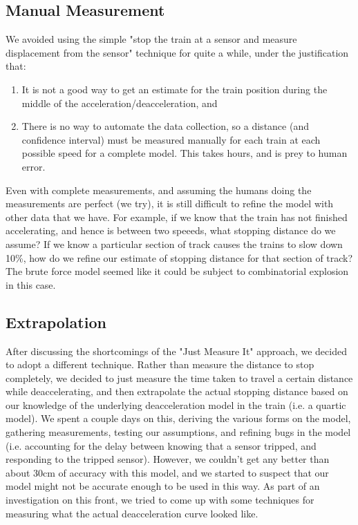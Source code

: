 \documentclass[titlepage]{article}
\begin{document}
\subsection{Manual Measurement}
We avoided using the simple "stop the train
at a sensor and measure displacement from the sensor" technique for quite a
while, under the justification that:
\begin{enumerate}
\item It is not a good way to get an estimate for the train position during
	the middle of the acceleration/deacceleration, and
\item There is no way to automate the data collection, so a distance (and
confidence interval) must be measured manually for each train at each possible
speed for a complete model. This takes hours, and is prey to human error.
\end{enumerate}
Even with complete measurements, and assuming the humans doing the measurements
are perfect (we try), it is still difficult to refine the model with other
data that we have. For example, if we know that the train has not finished
accelerating, and hence is between two speeeds, what stopping distance do we
assume? If we know a particular section of track causes the trains to slow
down 10\%, how do we refine our estimate of stopping distance for that section
of track? The brute force model seemed like it could be subject to
combinatorial explosion in this case.

\subsection{Extrapolation}
After discussing the shortcomings of the "Just Measure It" approach, we decided
to adopt a different technique. Rather than measure the distance to stop
completely, we decided to just measure the time taken to travel a certain
distance while deaccelerating, and then extrapolate the actual stopping distance
based on our knowledge of the underlying deacceleration model in the train
(i.e. a quartic model). We spent a couple days on this, deriving the various
forms on the model, gathering measurements, testing our assumptions, and
refining bugs in the model (i.e. accounting for the delay between knowing that
a sensor tripped, and responding to the tripped sensor). However, we couldn't
get any better than about 30cm of accuracy with this model, and we started to
suspect that our model might not be accurate enough to be used in this way. As
part of an investigation on this front, we tried to come up with some techniques
for measuring what the actual deacceleration curve looked like.
\end{document}
